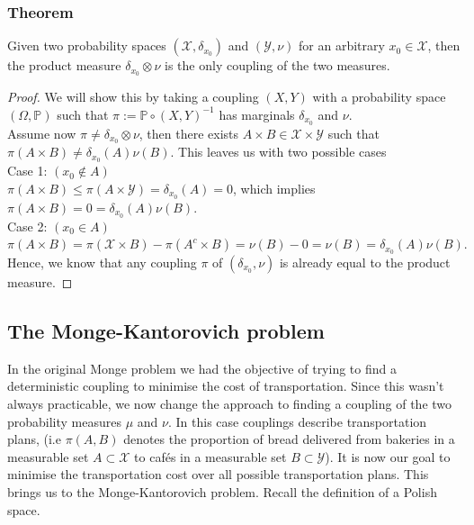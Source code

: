 \documentclass[11pt,a4paper]{article}
\begin{document}
\subsubsection{Theorem}
Given two probability spaces $(\mathcal{X},\delta_{x_0})$ and $(\mathcal{Y},\nu)$ for an arbitrary $x_0\in\mathcal{X}$, then the product measure 
$\delta_{x_0}\otimes\nu$ is the only coupling of the two measures. 
\begin{proof}
We will show this by taking a coupling $(X,Y)$ with a probability space $(\Omega,\mathbb{P})$ such that $\pi:=\mathbb{P}\circ{}(X,Y)^{-1}$ has marginals $\delta_{x_0}$ and $\nu$.\vspace{1em}\\ Assume now $\pi\neq\delta_{x_0}\otimes\nu$, then there exists $A\times{}B\in\mathcal{X\times{}Y}$ such that $\pi(A\times{}B)\neq\delta_{x_0}(A)\nu(B)$. This leaves us with two possible cases\vspace{1em}\\
Case 1: $(x_0\not\in{}A)$\vspace{0.5em}\\
$\pi(A\times{}B)\leq\pi(A\times\mathcal{Y})=\delta_{x_0}(A)=0$, which implies $\pi(A\times{}B)=0=\delta_{x_0}(A)\nu(B).$\vspace{1em}\\
Case 2: $(x_0\in{}A)$\vspace{0.5em}\\
$\pi(A\times{}B)=\pi(\mathcal{X}\times{}B)-\pi(A^c\times{}B)=\nu(B)-0=\nu(B) = \delta_{x_0}(A)\nu(B).$\vspace{1em}\\
Hence, we know that any coupling $\pi$ of $(\delta_{x_0},\nu)$ is already equal to the product measure. 
\end{proof}
\subsection{The Monge-Kantorovich problem}
In the original Monge problem we had the objective of trying to find a deterministic coupling to minimise the cost of transportation. Since this wasn't always practicable, we now change the approach to finding a coupling of the two probability measures $\mu$ and $\nu$. In this case couplings describe transportation plans, (i.e $\pi(A,B)$ denotes the proportion of bread delivered from bakeries in a measurable set $A\subset\mathcal{X}$ to cafés in a measurable set $B\subset\mathcal{Y}$). It is now our goal to minimise the transportation cost over all possible transportation plans. This brings us to the Monge-Kantorovich problem. Recall the definition of a Polish space.
\end{document}
